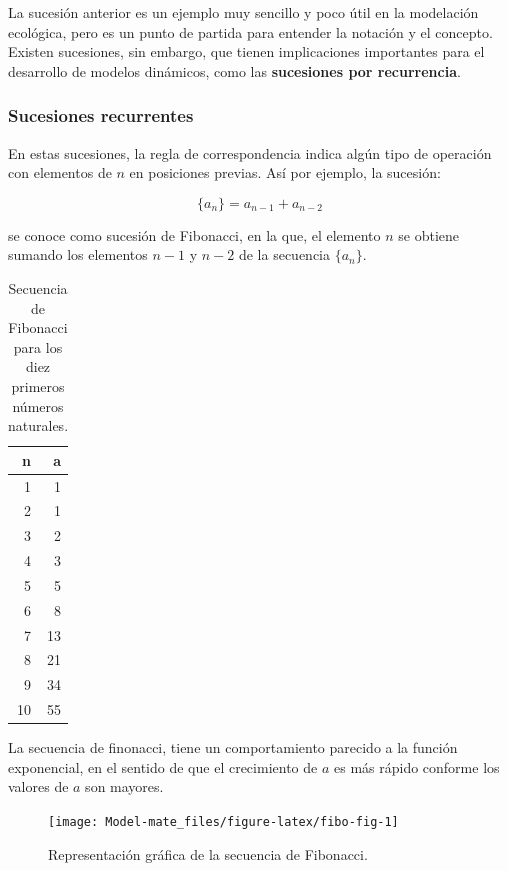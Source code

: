 \documentclass[
]{book}
\begin{document}
La sucesión anterior es un ejemplo muy sencillo y poco útil en la modelación ecológica, pero es un punto de partida para entender la notación y el concepto. Existen sucesiones, sin embargo, que tienen implicaciones importantes para el desarrollo de modelos dinámicos, como las \textbf{sucesiones por recurrencia}.

\hypertarget{sucesiones-recurrentes}{%
\subsubsection{Sucesiones recurrentes}\label{sucesiones-recurrentes}}

En estas sucesiones, la regla de correspondencia indica algún tipo de operación con elementos de \(n\) en posiciones previas. Así por ejemplo, la sucesión:

\begin{equation}
\{a_n\} = a_{n-1} + a_{n-2} \label{eq:fibonacci}
\end{equation}

se conoce como sucesión de Fibonacci, en la que, el elemento \(n\) se obtiene sumando los elementos \(n-1\) y \(n-2\) de la secuencia \(\{a_n\}\).

\begin{table}

\caption{\label{tab:fibo-tabla}Secuencia de Fibonacci para los diez primeros números naturales.}
\centering
\begin{tabular}[t]{r|r}
\hline
n & a\\
\hline
1 & 1\\
\hline
2 & 1\\
\hline
3 & 2\\
\hline
4 & 3\\
\hline
5 & 5\\
\hline
6 & 8\\
\hline
7 & 13\\
\hline
8 & 21\\
\hline
9 & 34\\
\hline
10 & 55\\
\hline
\end{tabular}
\end{table}

La secuencia de finonacci, tiene un comportamiento parecido a la función exponencial, en el sentido de que el crecimiento de \(a\) es más rápido conforme los valores de \(a\) son mayores.

\begin{figure}

{\centering \texttt{[image: Model-mate\_files/figure-latex/fibo-fig-1]} 

}

\caption{Representación gráfica de la secuencia de Fibonacci.}\label{fig:fibo-fig}
\end{figure}
\end{document}

